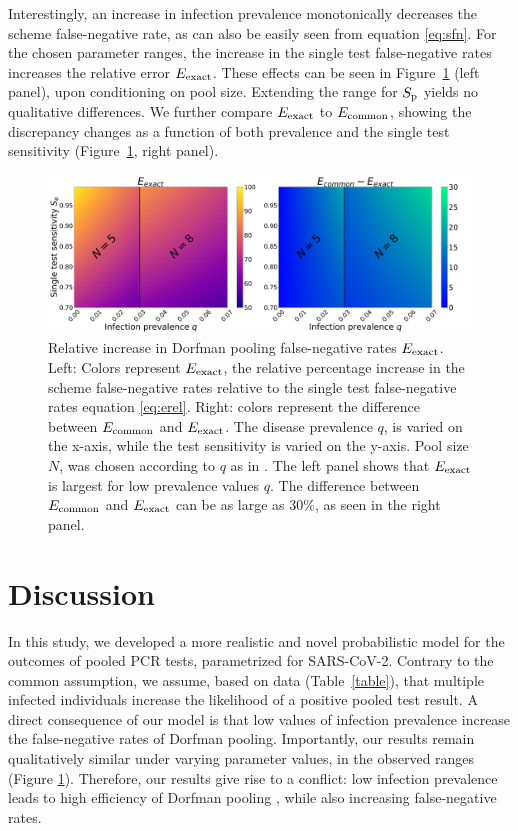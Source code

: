 \documentclass{article}
\begin{document}
Interestingly, an increase in infection prevalence monotonically
decreases the scheme false-negative rate, as can also be easily seen
from equation \eqref{eq:sfn}. For the chosen parameter ranges, the increase in
the single test false-negative rates increases the relative error
$E_{\text{{exact}}}$. These effects can be seen in Figure~\ref{fig1} (left
panel), upon conditioning on pool size. Extending the range for $S_\text{p}$
yields no qualitative differences. We further compare $E_{\text{{exact}}}$ to
$E_{\text{{common}}}$, showing the discrepancy changes as a function of both
prevalence and the single test sensitivity (Figure~\ref{fig1}, right
panel).
\begin{figure}[H]
  \centering
  \includegraphics[width=\textwidth]{heatmap_sfn.jpg}
  \caption{Relative increase in Dorfman pooling false-negative rates
    $E_{\text{{exact}}}$. Left: Colors represent $E_{\text{{exact}}}$, the relative
    percentage increase in the scheme false-negative rates relative to
    the single test false-negative rates equation \eqref{eq:erel}. Right:
    colors represent the difference between $E_{\text{{common}}}$ and
    $E_{\text{{exact}}}$. The disease prevalence $q$, is varied on the
    x-axis, while the test sensitivity is varied on the y-axis. Pool
    size $N$, was chosen according to $q$ as in
    \cite{DorfmanYuvalDor}. The left panel shows that $E_{\text{{exact}}}$ is
    largest for low prevalence values $q$. The difference between
    $E_{\text{{common}}}$ and $E_{\text{{exact}}}$ can be as large as 30\%, as seen
    in the right panel. }\label{fig1}
\end{figure}

\section*{Discussion}
In this study, we developed a more realistic and novel probabilistic
model for the outcomes of pooled PCR tests, parametrized for
SARS-CoV-2. Contrary to the common assumption, we assume, based on
data (Table~\ref{table}), that multiple infected individuals increase
the likelihood of a positive pooled test result. A direct consequence
of our model is that low values of infection
prevalence increase the false-negative rates of Dorfman pooling. Importantly, our results remain qualitatively similar under varying parameter values,
in the observed ranges \cite{KitComparison,EstimatingRatesKucrika,
  EstimatingRatesLourenco, InterpretingCOVID19Test} (Figure
\ref{fig1}). Therefore, our results give rise to a conflict: low infection
prevalence leads to high efficiency of Dorfman pooling
\cite{DorfmanYuvalDor}, while also increasing false-negative rates.
\end{document}
